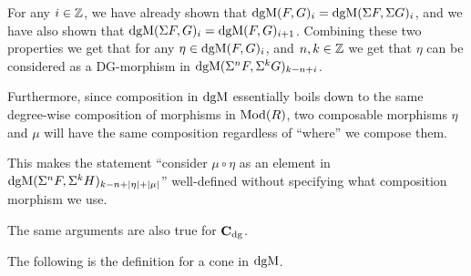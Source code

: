 \begin{remark}
    For any \( i \in {\mathbb{Z}} \), we have already shown that \( \operatorname{dgM}(F, G)_i = \operatorname{dgM}(\Sigma F, \Sigma G)_i \), and we have also shown that \( \operatorname{dgM}(\Sigma F, G)_i = \operatorname{dgM}(F, G)_{i + 1} \). Combining these two properties we get that for any \( \eta \in \operatorname{dgM}(F, G)_i \), and \( n, k \in {\mathbb{Z}} \) we get that \( \eta \) can be considered as a DG-morphism in \( \operatorname{dgM}(\Sigma^n F, \Sigma^k G)_{k - n + i} \).

    Furthermore, since composition in \( \operatorname{dgM} \) essentially boils down to the same degree-wise composition of morphisms in \( \operatorname{Mod}(R) \), two composable morphisms \( \eta \) and \( \mu \) will have the same composition regardless of ``where'' we compose them.

    This makes the statement ``consider \( \mu \circ \eta \) as an element in \( \operatorname{dgM}(\Sigma^n F, \Sigma^k H)_{k - n + |\eta| + |\mu|} \)'' well-defined without specifying what composition morphism we use.

    The same arguments are also true for \( \operatorname{\mathbf{C}}_{\operatorname{dg}} \).
\end{remark}

The following is the definition for a cone in \( \operatorname{dgM} \).

